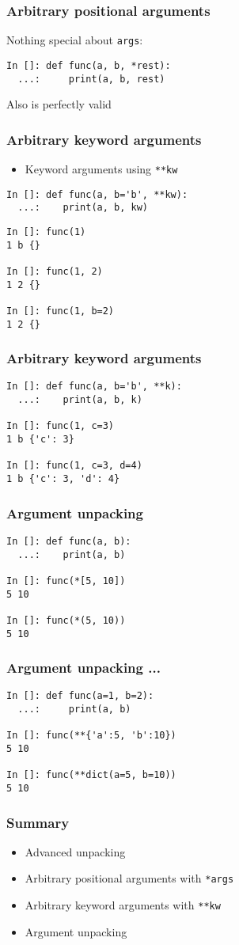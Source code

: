 \documentclass[14pt,compress]{beamer}
\begin{document}
\begin{frame}[fragile]
  \frametitle{Arbitrary positional arguments}

  Nothing special about \lstinline{args}:

\begin{lstlisting}
In []: def func(a, b, *rest):
  ...:     print(a, b, rest)

\end{lstlisting}
Also is perfectly valid
\end{frame}

\begin{frame}[fragile]
  \frametitle{Arbitrary keyword arguments}
  \begin{itemize}
  \item Keyword arguments using \lstinline{**kw}
  \end{itemize}
\begin{lstlisting}
In []: def func(a, b='b', **kw):
  ...:    print(a, b, kw)
\end{lstlisting}
  \pause
\begin{lstlisting}
In []: func(1)
1 b {}

In []: func(1, 2)
1 2 {}

In []: func(1, b=2)
1 2 {}
\end{lstlisting}
\end{frame}

\begin{frame}[fragile]
  \frametitle{Arbitrary keyword arguments}
\begin{lstlisting}
In []: def func(a, b='b', **k):
  ...:    print(a, b, k)

In []: func(1, c=3)
1 b {'c': 3}

In []: func(1, c=3, d=4)
1 b {'c': 3, 'd': 4}
\end{lstlisting}
\end{frame}


\begin{frame}[fragile]
  \frametitle{Argument unpacking}
\begin{lstlisting}
In []: def func(a, b):
  ...:    print(a, b)

In []: func(*[5, 10])
5 10

In []: func(*(5, 10))
5 10
\end{lstlisting}
\end{frame}

\begin{frame}[fragile]
  \frametitle{Argument unpacking ...}
\begin{lstlisting}
In []: def func(a=1, b=2):
  ...:     print(a, b)

In []: func(**{'a':5, 'b':10})
5 10

In []: func(**dict(a=5, b=10))
5 10
\end{lstlisting}
\end{frame}

\begin{frame}[fragile]
  \frametitle{Summary}
  \begin{itemize}
  \item Advanced unpacking
  \item Arbitrary positional arguments with \lstinline{*args}
  \item Arbitrary keyword arguments with \lstinline{**kw}
  \item Argument unpacking
  \end{itemize}
\end{frame}
\end{document}
